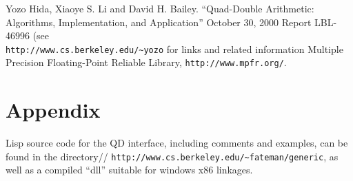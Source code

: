 \documentclass{article}
\begin{document}
\begin{thebibliography}{99}

Yozo Hida,  Xiaoye S. Li  and  David H. Bailey.
``Quad-Double Arithmetic: 
Algorithms, Implementation, and Application'' 
October 30, 2000  Report LBL-46996 (see \\
{\verb|http://www.cs.berkeley.edu/~yozo| for
links and related information}
Multiple Precision Floating-Point Reliable Library,
{\verb|http://www.mpfr.org/|}.

\end{thebibliography}
\section*{Appendix}
Lisp source code for the QD interface, including comments
and examples, can be found in the directory//
{\verb|http://www.cs.berkeley.edu/~fateman/generic|}, as well as
a compiled ``dll'' suitable for windows x86 linkages.
\end{document}
